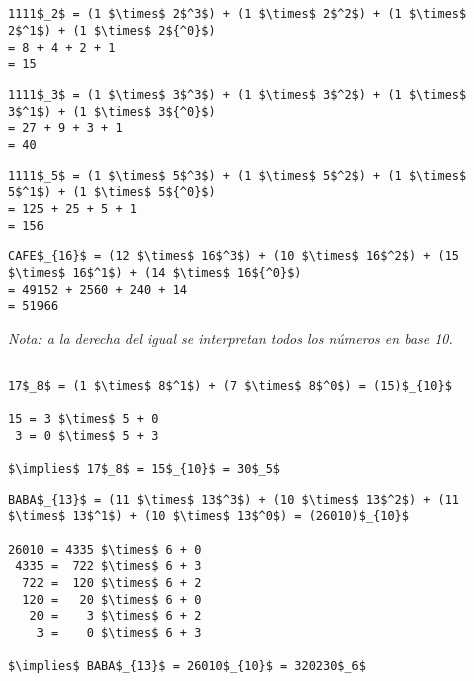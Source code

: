 \subsection{}

\begin{lstlisting}
1111$_2$ = (1 $\times$ 2$^3$) + (1 $\times$ 2$^2$) + (1 $\times$ 2$^1$) + (1 $\times$ 2${^0}$)
= 8 + 4 + 2 + 1
= 15
\end{lstlisting}

\begin{lstlisting}
1111$_3$ = (1 $\times$ 3$^3$) + (1 $\times$ 3$^2$) + (1 $\times$ 3$^1$) + (1 $\times$ 3${^0}$)
= 27 + 9 + 3 + 1
= 40
\end{lstlisting}

\begin{lstlisting}
1111$_5$ = (1 $\times$ 5$^3$) + (1 $\times$ 5$^2$) + (1 $\times$ 5$^1$) + (1 $\times$ 5${^0}$)
= 125 + 25 + 5 + 1
= 156
\end{lstlisting}

\begin{lstlisting}
CAFE$_{16}$ = (12 $\times$ 16$^3$) + (10 $\times$ 16$^2$) + (15 $\times$ 16$^1$) + (14 $\times$ 16${^0}$)
= 49152 + 2560 + 240 + 14
= 51966
\end{lstlisting}

\emph{Nota: a la derecha del igual se interpretan todos los números en base 10.}

\subsection{}

\begin{lstlisting}
17$_8$ = (1 $\times$ 8$^1$) + (7 $\times$ 8$^0$) = (15)$_{10}$

15 = 3 $\times$ 5 + 0
 3 = 0 $\times$ 5 + 3

$\implies$ 17$_8$ = 15$_{10}$ = 30$_5$
\end{lstlisting}

\begin{lstlisting}
BABA$_{13}$ = (11 $\times$ 13$^3$) + (10 $\times$ 13$^2$) + (11 $\times$ 13$^1$) + (10 $\times$ 13$^0$) = (26010)$_{10}$

26010 = 4335 $\times$ 6 + 0
 4335 =  722 $\times$ 6 + 3
  722 =  120 $\times$ 6 + 2
  120 =   20 $\times$ 6 + 0
   20 =    3 $\times$ 6 + 2
    3 =    0 $\times$ 6 + 3

$\implies$ BABA$_{13}$ = 26010$_{10}$ = 320230$_6$
\end{lstlisting}

